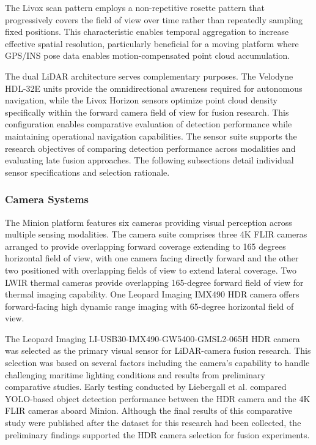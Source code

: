\documentclass{erauthesis}
\begin{document}
The Livox scan pattern employs a non-repetitive rosette pattern that progressively covers the field of view over time rather than repeatedly sampling fixed positions.
This characteristic enables temporal aggregation to increase effective spatial resolution, particularly beneficial for a moving platform where \ac{GPS}/\ac{INS} pose data enables motion-compensated point cloud accumulation.

The dual \ac{LiDAR} architecture serves complementary purposes.
The Velodyne HDL-32E units provide the omnidirectional awareness required for autonomous navigation, while the Livox Horizon sensors optimize point cloud density specifically within the forward camera field of view for fusion research.
This configuration enables comparative evaluation of detection performance while maintaining operational navigation capabilities.
The sensor suite supports the research objectives of comparing detection performance across modalities and evaluating late fusion approaches.
The following subsections detail individual sensor specifications and selection rationale.

            \subsubsection{Camera Systems}

The Minion platform features six cameras providing visual perception across multiple sensing modalities.
The camera suite comprises three 4K FLIR cameras arranged to provide overlapping forward coverage extending to 165 degrees horizontal field of view, with one camera facing directly forward and the other two positioned with overlapping fields of view to extend lateral coverage.
Two \ac{LWIR} thermal cameras provide overlapping 165-degree forward field of view for thermal imaging capability.
One Leopard Imaging IMX490 \ac{HDR} camera offers forward-facing high dynamic range imaging with 65-degree horizontal field of view.

The Leopard Imaging LI-USB30-IMX490-GW5400-GMSL2-065H \ac{HDR} camera was selected as the primary visual sensor for \ac{LiDAR}-camera fusion research.
This selection was based on several factors including the camera's capability to handle challenging maritime lighting conditions and results from preliminary comparative studies.
Early testing conducted by Liebergall et al. \cite{liebergall} compared YOLO-based object detection performance between the \ac{HDR} camera and the 4K FLIR cameras aboard Minion.
Although the final results of this comparative study were published after the dataset for this research had been collected, the preliminary findings supported the \ac{HDR} camera selection for fusion experiments.
\end{document}

